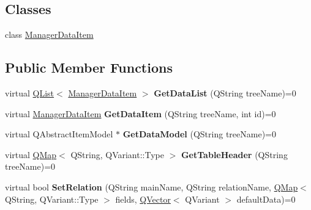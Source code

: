 \subsection*{Classes}
\begin{DoxyCompactItemize}
\item 
class \hyperlink{class_i_extendable_data_base_manager_plugin_1_1_manager_data_item}{Manager\+Data\+Item}
\end{DoxyCompactItemize}
\subsection*{Public Member Functions}
\begin{DoxyCompactItemize}
\item 
virtual \hyperlink{class_q_list}{Q\+List}$<$ \hyperlink{class_i_extendable_data_base_manager_plugin_1_1_manager_data_item}{Manager\+Data\+Item} $>$ {\bfseries Get\+Data\+List} (Q\+String tree\+Name)=0\hypertarget{class_i_extendable_data_base_manager_plugin_aeda41c0d78e0a702e589844a934a815c}{}\label{class_i_extendable_data_base_manager_plugin_aeda41c0d78e0a702e589844a934a815c}

\item 
virtual \hyperlink{class_i_extendable_data_base_manager_plugin_1_1_manager_data_item}{Manager\+Data\+Item} {\bfseries Get\+Data\+Item} (Q\+String tree\+Name, int id)=0\hypertarget{class_i_extendable_data_base_manager_plugin_a14c965c1f955f76bd370478211d58e22}{}\label{class_i_extendable_data_base_manager_plugin_a14c965c1f955f76bd370478211d58e22}

\item 
virtual Q\+Abstract\+Item\+Model $\ast$ {\bfseries Get\+Data\+Model} (Q\+String tree\+Name)=0\hypertarget{class_i_extendable_data_base_manager_plugin_ad0b28da100d3ebecb874b0ff6c6db9aa}{}\label{class_i_extendable_data_base_manager_plugin_ad0b28da100d3ebecb874b0ff6c6db9aa}

\item 
virtual \hyperlink{class_q_map}{Q\+Map}$<$ Q\+String, Q\+Variant\+::\+Type $>$ {\bfseries Get\+Table\+Header} (Q\+String tree\+Name)=0\hypertarget{class_i_extendable_data_base_manager_plugin_ae19dc8759c078506e5ae18e6f946930f}{}\label{class_i_extendable_data_base_manager_plugin_ae19dc8759c078506e5ae18e6f946930f}

\item 
virtual bool {\bfseries Set\+Relation} (Q\+String main\+Name, Q\+String relation\+Name, \hyperlink{class_q_map}{Q\+Map}$<$ Q\+String, Q\+Variant\+::\+Type $>$ fields, \hyperlink{class_q_vector}{Q\+Vector}$<$ Q\+Variant $>$ default\+Data)=0\hypertarget{class_i_extendable_data_base_manager_plugin_a744d2dd52fe84cf8ad3b67b43639030d}{}\label{class_i_extendable_data_base_manager_plugin_a744d2dd52fe84cf8ad3b67b43639030d}


\end{DoxyCompactItemize}

